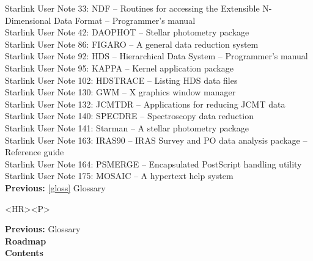 \documentclass[11pt]{article}
\newenvironment{latexonly}{}{}
\newcommand{\htmlref}[2]{#1}
\newcommand{\xref}[3]{#1}
\begin{document}
\xref{Starlink User Note 33}{sun33}{}: NDF -- Routines for
   accessing the Extensible N-Dimensional Data Format -- Programmer's
   manual\\
\xref{Starlink User Note 42}{sun42}{}: DAOPHOT -- Stellar
   photometry package\\
\xref{Starlink User Note 86}{sun86}{}: FIGARO -- A general data
   reduction system\\
\xref{Starlink User Note 92}{sun92}{}: HDS -- Hierarchical Data
   System -- Programmer's manual\\
\xref{Starlink User Note 95}{sun95}{}: KAPPA -- Kernel application
   package\\
\xref{Starlink User Note 102}{sun102}{}: HDSTRACE -- Listing HDS
   data files\\
\xref{Starlink User Note 130}{sun130}{}: GWM -- X graphics window
   manager\\
\xref{Starlink User Note 132}{sun132}{}: JCMTDR -- Applications
   for reducing JCMT data\\
\xref{Starlink User Note 140}{sun140}{}: SPECDRE -- Spectroscopy
   data reduction\\
\xref{Starlink User Note 141}{sun141}{}: Starman -- A stellar
   photometry package\\
\xref{Starlink User Note 163}{sun163}{}: IRAS90 -- IRAS Survey and
   PO data analysis package -- Reference guide\\
\xref{Starlink User Note 164}{sun164}{}: PSMERGE -- Encapsulated
   PostScript handling utility\\
\xref{Starlink User Note 175}{sun175}{}: MOSAIC -- A hypertext
   help system\\

\begin{latexonly}
{\bf Previous:} \ref{gloss} Glossary\\
\end{latexonly}

\begin{htmlonly}
\begin{rawhtml} <HR><P> \end{rawhtml}
{\bf \htmlref{Previous:}{gloss}} Glossary\\
{\bf \htmlref{Roadmap}{roadmap}}\\
{\bf \htmlref{Contents}{stardoccontents}}\\
\end{htmlonly}
\end{document}
